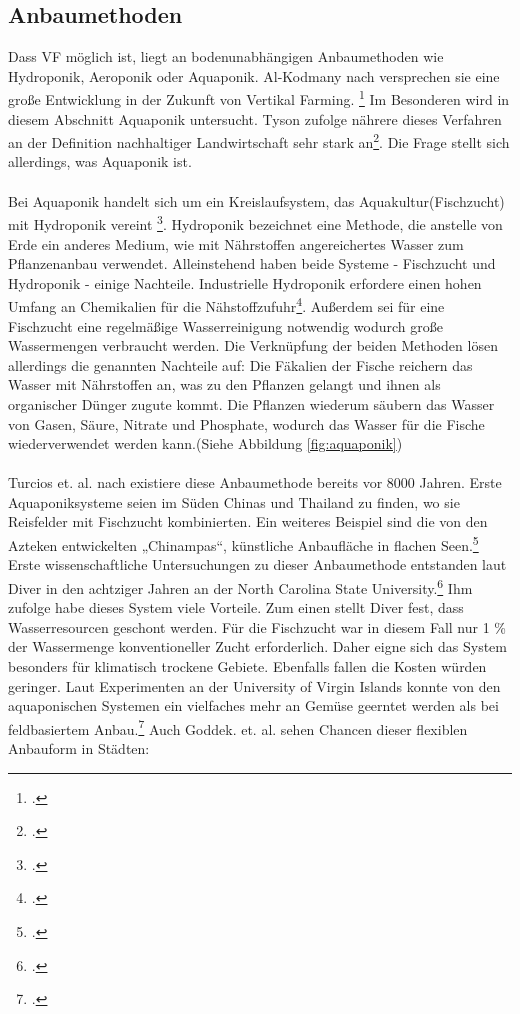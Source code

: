 \documentclass{scrartcl}
\begin{document}
\subsection{Anbaumethoden}
Dass VF möglich ist, liegt an bodenunabhängigen Anbaumethoden wie Hydroponik, Aeroponik oder Aquaponik. Al-Kodmany nach versprechen sie eine große Entwicklung in der Zukunft von Vertikal Farming. \footcite[S.1]{Al-Kodmany2018TheCity} Im Besonderen wird in diesem Abschnitt Aquaponik untersucht. Tyson zufolge nährere dieses Verfahren an der Definition nachhaltiger Landwirtschaft sehr stark an\footcite[Vgl.][S.36]{TysonV.2007ReconcilingMedium}. Die Frage stellt sich allerdings, was Aquaponik ist.\\
\\
Bei Aquaponik handelt sich um ein Kreislaufsystem, das Aquakultur(Fischzucht) mit Hydroponik vereint \footcite[Vgl.][S.44f]{Spring2012DerBasel-Stadt}. Hydroponik bezeichnet eine Methode, die anstelle von Erde ein anderes Medium, wie mit Nährstoffen angereichertes Wasser zum Pflanzenanbau verwendet. Alleinstehend haben beide Systeme - Fischzucht und Hydroponik - einige Nachteile. Industrielle Hydroponik erfordere einen hohen Umfang an Chemikalien für die Nähstoffzufuhr\footcite[Vgl.][S.8]{Al-Kodmany2018TheCity}. Außerdem sei für eine Fischzucht eine regelmäßige Wasserreinigung notwendig wodurch große Wassermengen verbraucht werden. Die Verknüpfung der beiden Methoden lösen allerdings die genannten Nachteile auf: Die Fäkalien der Fische reichern das Wasser mit Nährstoffen an, was zu den Pflanzen gelangt und ihnen als organischer Dünger zugute kommt. Die Pflanzen wiederum säubern das Wasser von Gasen, Säure, Nitrate und Phosphate, wodurch das Wasser für die Fische wiederverwendet werden kann.(Siehe Abbildung \ref{fig:aquaponik}) \\
\\
Turcios et. al. nach existiere diese Anbaumethode bereits vor 8000 Jahren. Erste Aquaponiksysteme seien im Süden Chinas und Thailand zu finden, wo sie Reisfelder mit Fischzucht kombinierten. Ein weiteres Beispiel sind die von den Azteken entwickelten „Chinampas“, künstliche Anbaufläche in flachen Seen.\footcite[Vgl.][S.838]{Turcios2014SustainableFuture} Erste wissenschaftliche Untersuchungen zu dieser Anbaumethode entstanden laut Diver in den achtziger Jahren an der North Carolina State University.\footcite[Vgl.][S.4]{Diver2006Aquaponics-IntegrationAquaculture} 
Ihm zufolge habe dieses System viele Vorteile. Zum einen stellt Diver fest, dass Wasserresourcen geschont werden. Für die Fischzucht war in diesem Fall nur 1 \% der Wassermenge konventioneller Zucht erforderlich. Daher eigne sich das System besonders für klimatisch trockene Gebiete. Ebenfalls fallen die Kosten würden geringer. Laut Experimenten an der University of Virgin Islands konnte von den aquaponischen Systemen ein vielfaches mehr an Gemüse geerntet werden als bei feldbasiertem Anbau.\footcite[Vgl.][S.7f]{Diver2006Aquaponics-IntegrationAquaculture} Auch Goddek. et. al. sehen Chancen dieser flexiblen Anbauform in Städten:
\end{document}
